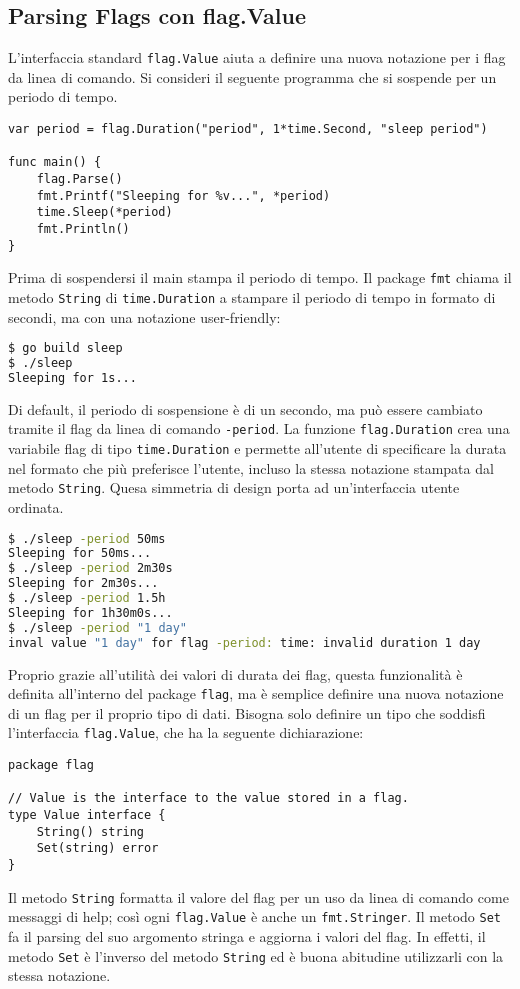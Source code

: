 \documentclass[../../thesis.tex]{subfiles}
\begin{document}
    \subsection{Parsing Flags con flag.Value}\label{subsec:parsing-flags-con-flag.value}
    L'interfaccia standard \verb"flag.Value" aiuta a definire una nuova notazione per i flag da linea di comando.
    Si consideri il seguente programma che si sospende per un periodo di tempo.
    \begin{lstlisting}[frame = single,label={lst:lstlisting6-4.1}]
var period = flag.Duration("period", 1*time.Second, "sleep period")

func main() {
    flag.Parse()
    fmt.Printf("Sleeping for %v...", *period)
    time.Sleep(*period)
    fmt.Println()
}
    \end{lstlisting}
    Prima di sospendersi il main stampa il periodo di tempo.
    Il package \verb"fmt" chiama il metodo \verb"String" di \verb"time.Duration" a stampare il periodo di tempo in formato di secondi, ma con una notazione user-friendly:
    \begin{lstlisting}[language = bash, frame = L,label={lst:lstlisting6-4.2}]
$ go build sleep
$ ./sleep
Sleeping for 1s...
    \end{lstlisting}
    Di default, il periodo di sospensione è di un secondo, ma può essere cambiato tramite il flag da linea di comando \verb"-period".
    La funzione \verb"flag.Duration" crea una variabile flag di tipo \verb"time.Duration" e permette all'utente di specificare la durata nel formato che più preferisce l'utente, incluso la stessa notazione stampata dal metodo \verb"String".
    Quesa simmetria di design porta ad un'interfaccia utente ordinata.
    \begin{lstlisting}[language = bash, frame = L,label={lst:lstlisting6-4.3}]
$ ./sleep -period 50ms
Sleeping for 50ms...
$ ./sleep -period 2m30s
Sleeping for 2m30s...
$ ./sleep -period 1.5h
Sleeping for 1h30m0s...
$ ./sleep -period "1 day"
inval value "1 day" for flag -period: time: invalid duration 1 day
    \end{lstlisting}
    Proprio grazie all'utilità dei valori di durata dei flag, questa funzionalità è definita all'interno del package \verb"flag", ma è semplice definire una nuova notazione di un flag per il proprio tipo di dati.
    Bisogna solo definire un tipo che soddisfi l'interfaccia \verb"flag.Value", che ha la seguente dichiarazione:
    \begin{lstlisting}[frame = single,label={lst:lstlisting6-4.4}]
package flag

// Value is the interface to the value stored in a flag.
type Value interface {
    String() string
    Set(string) error
}
    \end{lstlisting}
    Il metodo \verb"String" formatta il valore del flag per un uso da linea di comando come messaggi di help;
    così ogni \verb"flag.Value" è anche un \verb"fmt.Stringer".
    Il metodo \verb"Set" fa il parsing del suo argomento stringa e aggiorna i valori del flag.
    In effetti, il metodo \verb"Set" è l'inverso del metodo \verb"String" ed è buona abitudine utilizzarli con la stessa notazione.
    \hfill \vspace{12pt}
\end{document}

